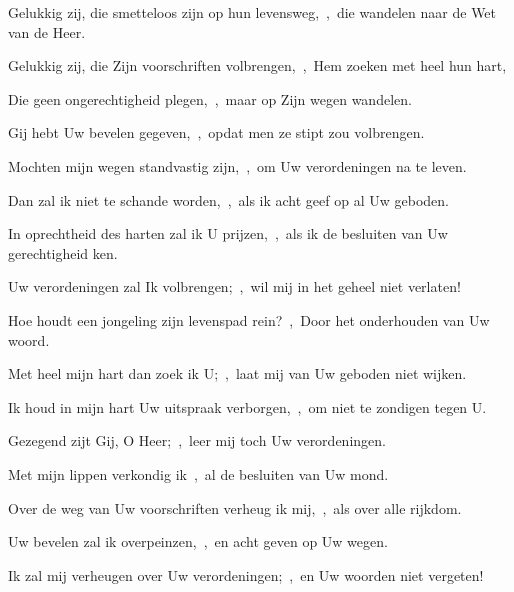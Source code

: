 \documentclass[12pt,twoside,a5paper]{article}
\begin{document}
\begin{halfparskip}
   Gelukkig zij, die smetteloos zijn op hun levensweg,~\sep\ die wandelen naar de Wet van de Heer.


  Gelukkig zij, die Zijn voorschriften volbrengen,~\sep\ Hem zoeken met heel hun hart,

  Die geen ongerechtigheid plegen,~\sep\ maar op Zijn wegen wandelen.

  Gij hebt Uw bevelen gegeven,~\sep\ opdat men ze stipt zou volbrengen.

  Mochten mijn wegen standvastig zijn,~\sep\ om Uw verordeningen na te leven.

  Dan zal ik niet te schande worden,~\sep\ als ik acht geef op al Uw geboden.

  In oprechtheid des harten zal ik U prijzen,~\sep\ als ik de besluiten van Uw gerechtigheid ken.

  Uw verordeningen zal Ik volbrengen;~\sep\ wil mij in het geheel niet verlaten!
\end{halfparskip}

\begin{halfparskip}
   Hoe houdt een jongeling zijn levenspad rein?~\sep\ Door het onderhouden van Uw woord.


  Met heel mijn hart dan zoek ik U;~\sep\ laat mij van Uw geboden niet wijken.

  Ik houd in mijn hart Uw uitspraak verborgen,~\sep\ om niet te zondigen tegen U.

  Gezegend zijt Gij, O Heer;~\sep\ leer mij toch Uw verordeningen.

  Met mijn lippen verkondig ik~\sep\ al de besluiten van Uw mond.

  Over de weg van Uw voorschriften verheug ik mij,~\sep\ als over alle rijkdom.

  Uw bevelen zal ik overpeinzen,~\sep\ en acht geven op Uw wegen.

  Ik zal mij verheugen over Uw verordeningen;~\sep\ en Uw woorden niet vergeten!
\end{halfparskip}
\end{document}
